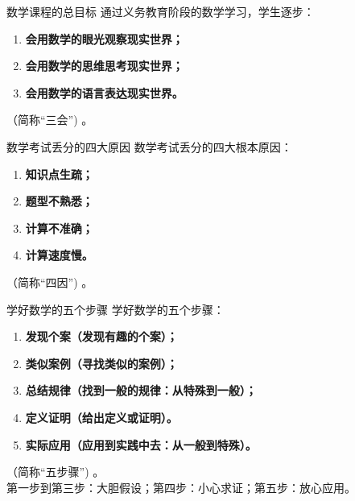 \begin{frame}{数学课程的总目标}
通过义务教育阶段的数学学习，学生逐步：\\
\begin{enumerate}[label={\arabic*.}]
\item \textbf{会用数学的眼光观察现实世界；}\\
\item \textbf{会用数学的思维思考现实世界；}\\
\item \textbf{会用数学的语言表达现实世界。}\\
\end{enumerate}
（简称“三会”) 。\\
\end{frame}

\begin{frame}{数学考试丢分的四大原因}
数学考试丢分的四大根本原因：\\
\begin{enumerate}[label={\arabic*.}]
\item \textbf{知识点生疏；}\\
\item \textbf{题型不熟悉；}\\
\item \textbf{计算不准确；}\\
\item \textbf{计算速度慢。} \\
\end{enumerate}
（简称“四因”) 。
\end{frame}

\begin{frame}{学好数学的五个步骤}
学好数学的五个步骤：\\
\begin{enumerate}[label={\arabic*.}]
\item \textbf{发现个案（发现有趣的个案）；}\\
\item \textbf{类似案例（寻找类似的案例）；}\\
\item \textbf{总结规律（找到一般的规律：从特殊到一般）；}\\
\item \textbf{定义证明（给出定义或证明）。} \\
\item \textbf{实际应用（应用到实践中去：从一般到特殊）。} \\
\end{enumerate}
（简称“五步骤”) 。\\
\alert{第一步到第三步：大胆假设；第四步：小心求证；第五步：放心应用。}
\end{frame}